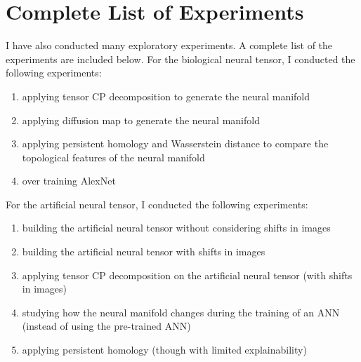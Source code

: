\chapter{Complete List of Experiments}
\label{appendix-all-experiments}
I have also conducted many exploratory experiments. A complete list of the experiments are included below.
For the biological neural tensor, I conducted the following experiments:
\begin{enumerate}
    \item applying tensor CP decomposition to generate the neural manifold
    \item applying diffusion map to generate the neural manifold
    \item applying persistent homology and Wasserstein distance to compare the topological features of the neural manifold
    \item over training AlexNet
\end{enumerate}

For the artificial neural tensor, I conducted the following experiments:
\begin{enumerate}
    \item building the artificial neural tensor without considering shifts in images
    \item building the artificial neural tensor with shifts in images
    \item applying tensor CP decomposition on the artificial neural tensor (with shifts in images)
    \item studying how the neural manifold changes during the training of an ANN (instead of using the pre-trained ANN)
    \item applying persistent homology (though with limited explainability)
\end{enumerate}

